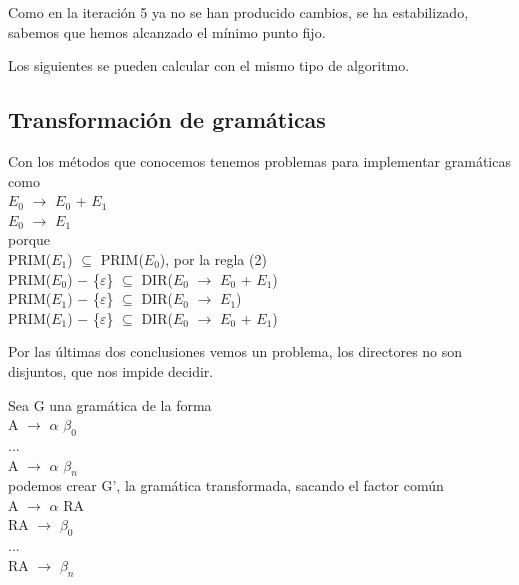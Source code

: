 \documentclass[\main/ApuntesPL.tex]{subfiles}
\begin{document}
      \par
      Como en la iteración 5 ya no se han producido cambios, se ha estabilizado, sabemos que hemos
      alcanzado el mínimo punto fijo.

      \bigskip
      \par
      Los siguientes se pueden calcular con el mismo tipo de algoritmo.

    \subsection{Transformación de gramáticas}
      \par
      Con los métodos que conocemos tenemos problemas para implementar gramáticas como\\
      \hspace{5mm}$E_0$ $\rightarrow$ $E_0$ + $E_1$\\
      \hspace{5mm}$E_0$ $\rightarrow$ $E_1$\\
      porque\\
      \hspace{5mm}PRIM($E_1$) $\subseteq$ PRIM($E_0$), por la regla (2)\\
      \hspace{5mm}PRIM($E_0$) $-$ \{$\varepsilon$\} $\subseteq$ DIR($E_0$ $\rightarrow$ $E_0$ + $E_1$)\\
      \hspace{5mm}PRIM($E_1$) $-$ \{$\varepsilon$\} $\subseteq$ DIR($E_0$ $\rightarrow$ $E_1$)\\
      \hspace{5mm}PRIM($E_1$) $-$ \{$\varepsilon$\} $\subseteq$ DIR($E_0$ $\rightarrow$ $E_0$ + $E_1$)

      \bigskip
      \par
      Por las últimas dos conclusiones vemos un problema, los directores no son disjuntos,
      que nos impide decidir.

      \bigskip
      \par
      Sea G una gramática de la forma\\
      \hspace{5mm}A $\rightarrow$ {\color{red}$\alpha$} $\beta_0$\\
      \hspace{5mm}...\\
      \hspace{5mm}A $\rightarrow$ {\color{red}$\alpha$} $\beta_n$\\
      \newpage
      podemos crear G', la gramática transformada, sacando el factor común\\
      \hspace{5mm}A $\rightarrow$ $\alpha$ RA\\
      \hspace{5mm}RA $\rightarrow$ $\beta_0$\\
      \hspace{5mm}...\\
      \hspace{5mm}RA $\rightarrow$ $\beta_n$\\
\end{document}
